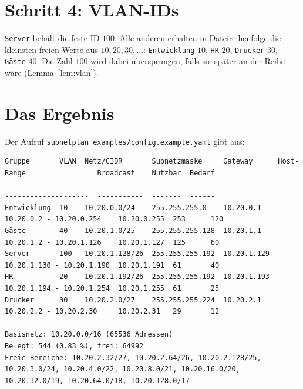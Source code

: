 \documentclass[a4paper,12pt, twoside]{report}
\theoremstyle{definition}
\begin{document}
\section{Schritt 4: VLAN-IDs}

\texttt{Server} behält die feste ID $100$. Alle anderen erhalten in Dateireihenfolge die kleinsten freien Werte aus $10,20,30,\ldots$: \texttt{Entwicklung} $10$, \texttt{HR} $20$, \texttt{Drucker} $30$, \texttt{Gäste} $40$. Die Zahl $100$ wird dabei übersprungen, falls sie später an der Reihe wäre (Lemma~\ref{lem:vlan}).

\section{Das Ergebnis}

Der Aufruf \texttt{subnetplan examples/config.example.yaml} gibt aus:

\begin{lstlisting}[basicstyle=\ttfamily\scriptsize, numbers=none, caption={Ausgabe des Beispiels}]
Gruppe       VLAN  Netz/CIDR       Subnetzmaske     Gateway      Host-Range                 Broadcast    Nutzbar  Bedarf
-----------  ----  --------------  ---------------  -----------  -------------------------  -----------  -------  ------
Entwicklung  10    10.20.0.0/24    255.255.255.0    10.20.0.1    10.20.0.2 - 10.20.0.254    10.20.0.255  253      120
Gäste        40    10.20.1.0/25    255.255.255.128  10.20.1.1    10.20.1.2 - 10.20.1.126    10.20.1.127  125      60
Server       100   10.20.1.128/26  255.255.255.192  10.20.1.129  10.20.1.130 - 10.20.1.190  10.20.1.191  61       40
HR           20    10.20.1.192/26  255.255.255.192  10.20.1.193  10.20.1.194 - 10.20.1.254  10.20.1.255  61       25
Drucker      30    10.20.2.0/27    255.255.255.224  10.20.2.1    10.20.2.2 - 10.20.2.30     10.20.2.31   29       12

Basisnetz: 10.20.0.0/16 (65536 Adressen)
Belegt: 544 (0.83 %), frei: 64992
Freie Bereiche: 10.20.2.32/27, 10.20.2.64/26, 10.20.2.128/25, 10.20.3.0/24, 10.20.4.0/22, 10.20.8.0/21, 10.20.16.0/20, 10.20.32.0/19, 10.20.64.0/18, 10.20.128.0/17
\end{lstlisting}
\end{document}
